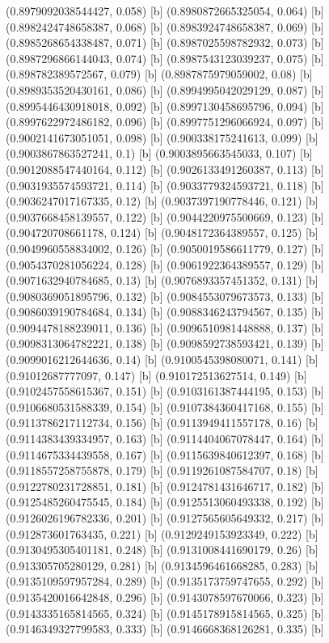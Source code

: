 {{{(0.8979092038544427, 0.058) [b] 
(0.8980872665325054, 0.064) [b] 
(0.8982424748658387, 0.068) [b] 
(0.8983924748658387, 0.069) [b] 
(0.8985268654338487, 0.071) [b] 
(0.8987025598782932, 0.073) [b] 
(0.8987296866144043, 0.074) [b] 
(0.8987543123039237, 0.075) [b] 
(0.898782389572567, 0.079) [b] 
(0.8987875979059002, 0.08) [b] 
(0.8989353520430161, 0.086) [b] 
(0.8994995042029129, 0.087) [b] 
(0.8995446430918018, 0.092) [b] 
(0.8997130458695796, 0.094) [b] 
(0.8997622972486182, 0.096) [b] 
(0.8997751296066924, 0.097) [b] 
(0.9002141673051051, 0.098) [b] 
(0.900338175241613, 0.099) [b] 
(0.9003867863527241, 0.1) [b] 
(0.9003895663545033, 0.107) [b] 
(0.9012088547440164, 0.112) [b] 
(0.9026133491260387, 0.113) [b] 
(0.9031935574593721, 0.114) [b] 
(0.9033779324593721, 0.118) [b] 
(0.9036247017167335, 0.12) [b] 
(0.9037397190778446, 0.121) [b] 
(0.9037668458139557, 0.122) [b] 
(0.9044220975500669, 0.123) [b] 
(0.904720708661178, 0.124) [b] 
(0.9048172364389557, 0.125) [b] 
(0.9049960558834002, 0.126) [b] 
(0.9050019586611779, 0.127) [b] 
(0.9054370281056224, 0.128) [b] 
(0.9061922364389557, 0.129) [b] 
(0.9071632940784685, 0.13) [b] 
(0.9076893357451352, 0.131) [b] 
(0.9080369051895796, 0.132) [b] 
(0.9084553079673573, 0.133) [b] 
(0.9086039190784684, 0.134) [b] 
(0.9088346243794567, 0.135) [b] 
(0.9094478188239011, 0.136) [b] 
(0.9096510981448888, 0.137) [b] 
(0.9098313064782221, 0.138) [b] 
(0.9098592738593421, 0.139) [b] 
(0.9099016212644636, 0.14) [b] 
(0.9100545398080071, 0.141) [b] 
(0.91012687777097, 0.147) [b] 
(0.910172513627514, 0.149) [b] 
(0.9102457558615367, 0.151) [b] 
(0.9103161387444195, 0.153) [b] 
(0.9106680531588339, 0.154) [b] 
(0.9107384360417168, 0.155) [b] 
(0.9113786217112734, 0.156) [b] 
(0.9113949411557178, 0.16) [b] 
(0.9114383439334957, 0.163) [b] 
(0.9114404067078447, 0.164) [b] 
(0.9114675334439558, 0.167) [b] 
(0.9115639840612397, 0.168) [b] 
(0.9118557258755878, 0.179) [b] 
(0.9119261087584707, 0.18) [b] 
(0.9122780231728851, 0.181) [b] 
(0.9124781431646717, 0.182) [b] 
(0.9125485260475545, 0.184) [b] 
(0.9125513060493338, 0.192) [b] 
(0.9126026196782336, 0.201) [b] 
(0.9127565605649332, 0.217) [b] 
(0.912873601763435, 0.221) [b] 
(0.9129249153923349, 0.222) [b] 
(0.9130495305401181, 0.248) [b] 
(0.9131008441690179, 0.26) [b] 
(0.913305705280129, 0.281) [b] 
(0.9134596461668285, 0.283) [b] 
(0.9135109597957284, 0.289) [b] 
(0.9135173759747655, 0.292) [b] 
(0.9135420016642848, 0.296) [b] 
(0.9143078597670066, 0.323) [b] 
(0.9143335165814565, 0.324) [b] 
(0.9145178915814565, 0.325) [b] 
(0.9146349327799583, 0.333) [b] 
(0.9146668368126281, 0.335) [b] 
}}}
